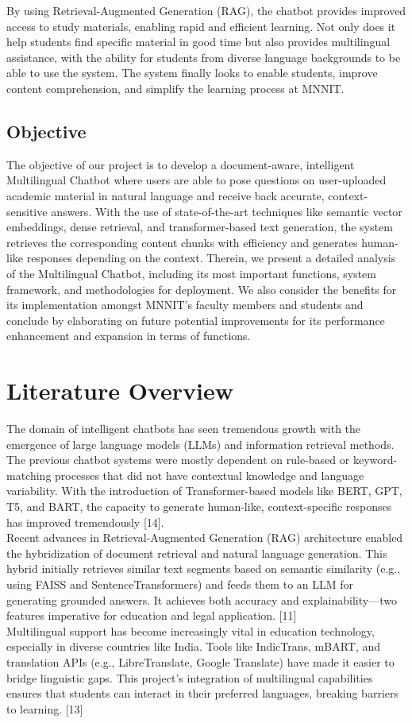 \documentclass[12pt]{report}
\begin{document}
By using Retrieval-Augmented Generation (RAG), the chatbot provides improved access to study materials, enabling rapid and efficient learning. Not only does it help students find specific material in good time but also provides multilingual assistance, with the ability for students from diverse language backgrounds to be able to use the system. The system finally looks to enable students, improve content comprehension, and simplify the learning process at MNNIT.


\section{Objective}
The objective of our project is to develop a document-aware, intelligent Multilingual Chatbot where users are able to pose questions on user-uploaded academic material in natural language and receive back accurate, context-sensitive answers. With the use of state-of-the-art techniques like semantic vector embeddings, dense retrieval, and transformer-based text generation, the system retrieves the corresponding content chunks with efficiency and generates human-like responses depending on the context.
Therein, we present a detailed analysis of the Multilingual Chatbot, including its most important functions, system framework, and methodologies for deployment. We also consider the benefits for its implementation amongst MNNIT's faculty members and students and conclude by elaborating on future potential improvements for its performance enhancement and expansion in terms of functions.

\chapter{Literature Overview}
The domain of intelligent chatbots has seen tremendous growth with the emergence of large language models (LLMs) and information retrieval methods. The previous chatbot systems were mostly dependent on rule-based or keyword-matching processes that did not have contextual knowledge and language variability. With the introduction of Transformer-based models like BERT, GPT, T5, and BART, the capacity to generate human-like, context-specific responses has improved tremendously [14].
\\
Recent advances in Retrieval-Augmented Generation (RAG) architecture enabled the hybridization of document retrieval and natural language generation. This hybrid initially retrieves similar text segments based on semantic similarity (e.g., using FAISS and SentenceTransformers) and feeds them to an LLM for generating grounded answers. It achieves both accuracy and explainability—two features imperative for education and legal application. [11]
\\
Multilingual support has become increasingly vital in education technology, especially in diverse countries like India. Tools like IndicTrans, mBART, and translation APIs (e.g., LibreTranslate, Google Translate) have made it easier to bridge linguistic gaps. This project's integration of multilingual capabilities ensures that students can interact in their preferred languages, breaking barriers to learning. [13]	
\end{document}

